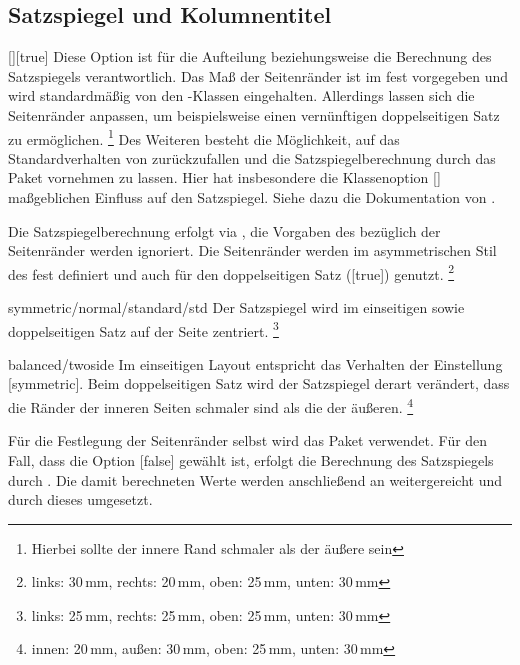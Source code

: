 \documentclass[%
  english,ngerman,%
  headings=optiontoheadandtoc,captions=tableheading,numbers=noenddot,%
  chapterpage,cdfoot,%
]{tudscrman}
\begin{document}
\subsection{Satzspiegel und Kolumnentitel}
%
\begin{Declaration}{[\PSet]}[true]%
\printdeclarationlist%
%
%
%
Diese Option ist für die Aufteilung beziehungsweise die Berechnung des 
Satzspiegels verantwortlich. Das Maß der Seitenränder ist im \CD fest vorgegeben 
und wird standardmäßig von den \TUDScript-Klassen eingehalten. Allerdings lassen 
sich die Seitenränder anpassen, um beispielsweise einen vernünftigen 
doppelseitigen Satz zu ermöglichen.%
\footnote{Hierbei sollte der innere Rand schmaler als der äußere sein}
Des Weiteren besteht die Möglichkeit, auf das Standardverhalten von 
\KOMAScript{} zurückzufallen und die Satzspiegelberechnung durch das Paket
 vornehmen zu lassen. Hier hat insbesondere die Klassenoption 
[\PSet] maßgeblichen Einfluss auf den Satzspiegel. Siehe dazu die 
Dokumentation von \KOMAScript{}.
%
\begin{values}
\itemfalse
  Die Satzspiegelberechnung erfolgt via , die Vorgaben des 
  \CDs bezüglich der Seitenränder werden ignoriert.
  Die Seitenränder werden im asymmetrischen Stil des \CDs fest definiert und 
  auch für den doppelseitigen Satz ([true]) genutzt.%
  \footnote{links: 30\,mm, rechts: 20\,mm, oben: 25\,mm, unten: 30\,mm}
\item[symmetric/normal/standard/std]
  Der Satzspiegel wird im einseitigen sowie doppelseitigen Satz auf der Seite 
  zentriert.%
  \footnote{links: 25\,mm, rechts: 25\,mm, oben: 25\,mm, unten: 30\,mm}
\item[balanced/twoside]
  Im einseitigen Layout entspricht das Verhalten der Einstellung 
  [symmetric]. Beim doppelseitigen Satz wird der Satzspiegel 
  derart verändert, dass die Ränder der inneren Seiten schmaler sind als die der 
  äußeren.%
  \footnote{innen: 20\,mm, außen: 30\,mm, oben: 25\,mm, unten: 30\,mm}
\end{values}
%
Für die Festlegung der Seitenränder selbst wird das Paket  
verwendet. Für den Fall, dass die Option [false] gewählt ist, 
erfolgt die Berechnung des Satzspiegels durch . Die damit 
berechneten Werte werden anschließend an  weitergereicht und 
durch dieses umgesetzt.
\end{Declaration}
\end{document}
